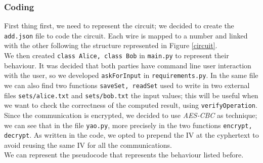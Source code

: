 \documentclass[12pt]{article}
\newcommand{\inlinecode}{\texttt}
\begin{document}
\subsubsection{Coding}
First thing first, we need to represent the circuit; we decided to create the \inlinecode{add.json} file to code the circuit. Each wire is mapped to a number and linked with the other following the structure represented in Figure \ref{circuit}.\\
We then created \inlinecode{class Alice, class Bob} in \inlinecode{main.py} to represent their behaviour.
It was decided that both parties have command line user interaction with the user, so we developed \inlinecode{askForInput} in \inlinecode{requirements.py}. In the same file we can also find two functions \inlinecode{saveSet, readSet} used to write in two external files \inlinecode{sets/alice.txt} and \inlinecode{sets/bob.txt} the input values; this will be useful when we want to check the correctness of the computed result, using \inlinecode{verifyOperation}.\\
Since the communication is encrypted, we decided to use \textit{AES-CBC} as technique; we can see that in the file \inlinecode{yao.py}, more precisely in the two functions \inlinecode{encrypt, decrypt}. As written in the code, we opted to prepend the IV at the cyphertext to avoid reusing the same IV for all the communications.\\
We can represent the pseudocode that represents the behaviour listed before.\\
\end{document}
